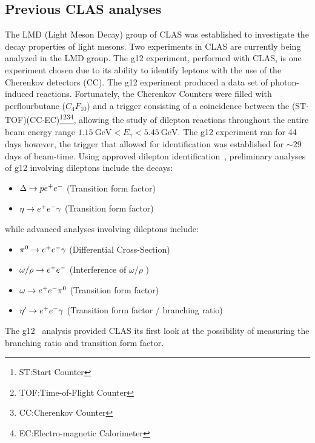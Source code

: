 	\subsection{Previous CLAS analyses}
	The LMD (Light Meson Decay) group of CLAS was established to investigate the decay properties of light mesons. Two experiments in CLAS are currently being analyzed in the LMD group. The g12 experiment, performed with CLAS, is one experiment chosen due to its ability to identify leptons with the use of the Cherenkov detectors (CC).
	The g12 experiment produced a data set of photon-induced reactions. Fortunately, the Cherenkov Counters were filled with perflourbutane ($C_4F_{10}$) and a trigger consisting of a coincidence between the (ST$\cdot$TOF)(CC$\cdot$EC)\footnote{ST:Start Counter}\footnote{TOF:Time-of-Flight Counter}\footnote{CC:Cherenkov Counter}\footnote{EC:Electro-magnetic Calorimeter}, allowing the study of dilepton reactions throughout the entire beam energy range $1.15 \ \mathrm{GeV}<E_\gamma <5.45 \ \mathrm{GeV}$. The g12 experiment ran for 44 days however, the trigger that allowed for \epemT identification was established for $\sim$29 days of beam-time. Using approved dilepton identification~\cite{g12note}, preliminary analyses of g12 involving dileptons include the decays:
	\begin{itemize}
		\item $\Delta \to p e^+e^-$ (Transition form factor)
		\item $\eta \to e^+e^- \gamma$ (Transition form factor)
	\end{itemize}
	while advanced analyses involving dileptons include:
	\begin{itemize}
		\item $\pi^{0} \to e^+e^- \gamma$ (Differential Cross-Section)
		\item $\omega / \rho \to e^+e^-$ (Interference of $\omega/\rho$ )
		\item $\omega \to e^+e^- \pi^{0}$ (Transition form factor)
		\item $\eta^{\prime} \to e^+e^- \gamma$ (Transition form factor / branching ratio)
	\end{itemize}
	The g12 \etaPDal \ analysis provided CLAS its first look at the possibility of measuring the branching ratio and transition form factor. 
